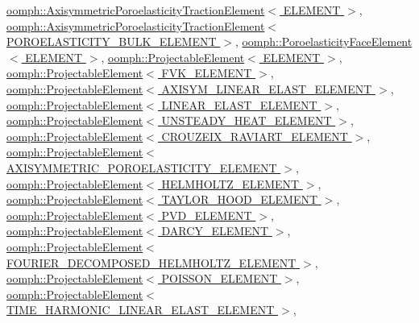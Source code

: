 \hyperlink{classoomph_1_1AxisymmetricPoroelasticityTractionElement_a9779f0ccbce1f73b77c64b91ed9ebefa}{oomph\+::\+Axisymmetric\+Poroelasticity\+Traction\+Element$<$ E\+L\+E\+M\+E\+N\+T $>$}, \hyperlink{classoomph_1_1AxisymmetricPoroelasticityTractionElement_a9779f0ccbce1f73b77c64b91ed9ebefa}{oomph\+::\+Axisymmetric\+Poroelasticity\+Traction\+Element$<$ P\+O\+R\+O\+E\+L\+A\+S\+T\+I\+C\+I\+T\+Y\+\_\+\+B\+U\+L\+K\+\_\+\+E\+L\+E\+M\+E\+N\+T $>$}, \hyperlink{classoomph_1_1PoroelasticityFaceElement_a14cbf11e9cf001563087f15f8f9806b7}{oomph\+::\+Poroelasticity\+Face\+Element$<$ E\+L\+E\+M\+E\+N\+T $>$}, \hyperlink{classoomph_1_1ProjectableElement_a5b6894eda403bd2b9d2cf1e0314d7a23}{oomph\+::\+Projectable\+Element$<$ E\+L\+E\+M\+E\+N\+T $>$}, \hyperlink{classoomph_1_1ProjectableElement_a5b6894eda403bd2b9d2cf1e0314d7a23}{oomph\+::\+Projectable\+Element$<$ F\+V\+K\+\_\+\+E\+L\+E\+M\+E\+N\+T $>$}, \hyperlink{classoomph_1_1ProjectableElement_a5b6894eda403bd2b9d2cf1e0314d7a23}{oomph\+::\+Projectable\+Element$<$ A\+X\+I\+S\+Y\+M\+\_\+\+L\+I\+N\+E\+A\+R\+\_\+\+E\+L\+A\+S\+T\+\_\+\+E\+L\+E\+M\+E\+N\+T $>$}, \hyperlink{classoomph_1_1ProjectableElement_a5b6894eda403bd2b9d2cf1e0314d7a23}{oomph\+::\+Projectable\+Element$<$ L\+I\+N\+E\+A\+R\+\_\+\+E\+L\+A\+S\+T\+\_\+\+E\+L\+E\+M\+E\+N\+T $>$}, \hyperlink{classoomph_1_1ProjectableElement_a5b6894eda403bd2b9d2cf1e0314d7a23}{oomph\+::\+Projectable\+Element$<$ U\+N\+S\+T\+E\+A\+D\+Y\+\_\+\+H\+E\+A\+T\+\_\+\+E\+L\+E\+M\+E\+N\+T $>$}, \hyperlink{classoomph_1_1ProjectableElement_a5b6894eda403bd2b9d2cf1e0314d7a23}{oomph\+::\+Projectable\+Element$<$ C\+R\+O\+U\+Z\+E\+I\+X\+\_\+\+R\+A\+V\+I\+A\+R\+T\+\_\+\+E\+L\+E\+M\+E\+N\+T $>$}, \hyperlink{classoomph_1_1ProjectableElement_a5b6894eda403bd2b9d2cf1e0314d7a23}{oomph\+::\+Projectable\+Element$<$ A\+X\+I\+S\+Y\+M\+M\+E\+T\+R\+I\+C\+\_\+\+P\+O\+R\+O\+E\+L\+A\+S\+T\+I\+C\+I\+T\+Y\+\_\+\+E\+L\+E\+M\+E\+N\+T $>$}, \hyperlink{classoomph_1_1ProjectableElement_a5b6894eda403bd2b9d2cf1e0314d7a23}{oomph\+::\+Projectable\+Element$<$ H\+E\+L\+M\+H\+O\+L\+T\+Z\+\_\+\+E\+L\+E\+M\+E\+N\+T $>$}, \hyperlink{classoomph_1_1ProjectableElement_a5b6894eda403bd2b9d2cf1e0314d7a23}{oomph\+::\+Projectable\+Element$<$ T\+A\+Y\+L\+O\+R\+\_\+\+H\+O\+O\+D\+\_\+\+E\+L\+E\+M\+E\+N\+T $>$}, \hyperlink{classoomph_1_1ProjectableElement_a5b6894eda403bd2b9d2cf1e0314d7a23}{oomph\+::\+Projectable\+Element$<$ P\+V\+D\+\_\+\+E\+L\+E\+M\+E\+N\+T $>$}, \hyperlink{classoomph_1_1ProjectableElement_a5b6894eda403bd2b9d2cf1e0314d7a23}{oomph\+::\+Projectable\+Element$<$ D\+A\+R\+C\+Y\+\_\+\+E\+L\+E\+M\+E\+N\+T $>$}, \hyperlink{classoomph_1_1ProjectableElement_a5b6894eda403bd2b9d2cf1e0314d7a23}{oomph\+::\+Projectable\+Element$<$ F\+O\+U\+R\+I\+E\+R\+\_\+\+D\+E\+C\+O\+M\+P\+O\+S\+E\+D\+\_\+\+H\+E\+L\+M\+H\+O\+L\+T\+Z\+\_\+\+E\+L\+E\+M\+E\+N\+T $>$}, \hyperlink{classoomph_1_1ProjectableElement_a5b6894eda403bd2b9d2cf1e0314d7a23}{oomph\+::\+Projectable\+Element$<$ P\+O\+I\+S\+S\+O\+N\+\_\+\+E\+L\+E\+M\+E\+N\+T $>$}, \hyperlink{classoomph_1_1ProjectableElement_a5b6894eda403bd2b9d2cf1e0314d7a23}{oomph\+::\+Projectable\+Element$<$ T\+I\+M\+E\+\_\+\+H\+A\+R\+M\+O\+N\+I\+C\+\_\+\+L\+I\+N\+E\+A\+R\+\_\+\+E\+L\+A\+S\+T\+\_\+\+E\+L\+E\+M\+E\+N\+T $>$}, 